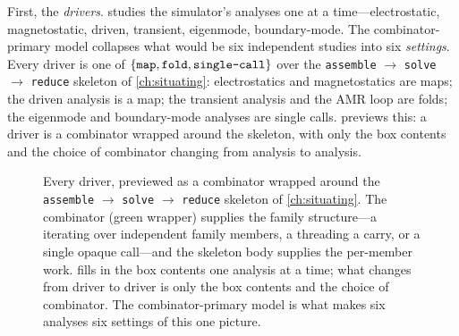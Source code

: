 First, the \emph{drivers}.  studies the simulator's analyses
one at a time---electrostatic, magnetostatic, driven, transient, eigenmode,
boundary-mode. The combinator-primary model collapses what would be six
independent studies into six \emph{settings}. Every driver is one of
$\{\texttt{map}, \texttt{fold}, \texttt{single-call}\}$ over the
\texttt{assemble} $\to$ \texttt{solve} $\to$ \texttt{reduce} skeleton of
\cref{ch:situating}: electrostatics and magnetostatics are 
maps; the driven analysis is a  map; the transient analysis
and the AMR loop are  folds; the eigenmode and boundary-mode
analyses are single  calls.  previews this:
a driver is a combinator wrapped around the skeleton, with only the box contents
and the choice of combinator changing from analysis to analysis.

\begin{figure}[t]
\centering
{}
\caption[A driver as a combinator over the skeleton]{Every driver, previewed as a
combinator wrapped around the \texttt{assemble} $\to$ \texttt{solve} $\to$
\texttt{reduce} skeleton of \cref{ch:situating}. The combinator (green wrapper)
supplies the family structure---a  iterating over independent family
members, a  threading a carry, or a single opaque call---and the
skeleton body supplies the per-member work.  fills in the box
contents one analysis at a time; what changes from driver to driver is only the box
contents and the choice of combinator. The combinator-primary model is what makes
six analyses six settings of this one picture.}
\label{fig:driverskel}
\end{figure}

